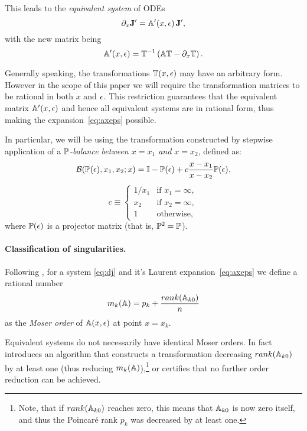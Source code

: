 \documentclass[12pt,a4paper]{article}
\begin{document}
This leads to the {\em equivalent system} of ODEs
\begin{equation}
  \partial_x \mathbf{J}' = \mathbb{A}'(x,\epsilon)\,\mathbf{J}',
\end{equation}
with the new matrix being
\begin{equation}
\label{eq:ta}
  \mathbb{A}'(x,\epsilon) = \mathbb{T}^{-1} \left( \mathbb{A} \mathbb{T} - \partial_x \mathbb{T} \right).
\end{equation}

Generally speaking, the transformations $\mathbb{T}(x,\epsilon)$ may have an arbitrary form.
However in the scope of this paper we will require the transformation matrices to be rational in both $x$ and $\epsilon$.
This restriction guarantees that the equivalent matrix $\mathbb{A}'(x,\epsilon)$ and hence all equivalent systems are in rational form, thus making the expansion~\eqref{eq:axeps} possible.

In particular, we will be using the transformation constructed by stepwise application of a \textit{$\mathbb{P}$-balance between $x=x_1$ and $x=x_2$}, defined as:
\begin{equation}
\label{eq:bal}
    \mathcal{B}(\mathbb{P}(\epsilon), x_1, x_2; x) = \mathbb{I} - \mathbb{P}(\epsilon) + c \frac{x-x_1}{x-x_2} \mathbb{P}(\epsilon),
\end{equation}
\begin{equation*}
    c \equiv
    \begin{cases}
        1/x_1 & \text{if $x_1=\infty$}, \\
        x_2 & \text{if $x_2=\infty$}, \\
        1 & \text{otherwise},
    \end{cases}
\end{equation*}
where $\mathbb{P}(\epsilon)$ is a projector matrix (that is, $\mathbb{P}^2=\mathbb{P}$).

\paragraph{Classification of singularities.}
Following \cite{Mos59}, for a system \eqref{eq:dj} and it's Laurent expansion~\eqref{eq:axeps} we define a rational number
\begin{equation}
\label{eq:mk}
    m_k(\mathbb{A}) = p_k + \frac{rank(\mathbb{A}_{k0})}{n}
\end{equation}
as the {\em Moser order} of $\mathbb{A}(x,\epsilon)$ at point $x=x_k$.

Equivalent systems do not necessarily have identical Moser orders.
In fact \cite{Mos59} introduces an algorithm that constructs a transformation decreasing $rank(\mathbb{A}_{k0})$ by at least one (thus reducing $m_k(\mathbb{A})$),\footnote{Note, that if $rank(\mathbb{A}_{k0})$ reaches zero, this means that $\mathbb{A}_{k0}$ is now zero itself, and thus the Poincar\'e rank $p_k$ was decreased by at least one.} or certifies that no further order reduction can be achieved.
\end{document}
